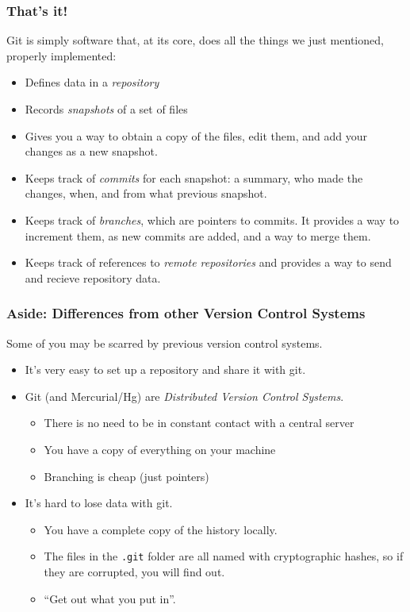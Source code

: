 \documentclass{beamer}
\begin{document}
\begin{frame}[fragile]
\frametitle{That's it!}
Git is simply software that, at its core, does all the things we just mentioned, properly implemented:
\begin{itemize}
\item Defines data in a \emph{repository}
\item Records \emph{snapshots} of a set of files
\item Gives you a way to obtain a copy of the files, edit them, and add your changes as a new snapshot.
\item Keeps track of \emph{commits} for each snapshot: a summary, who made the changes, when, and from what previous snapshot.
\item Keeps track of \emph{branches}, which are pointers to commits. It provides a way to increment them, as new commits are added, and a way to merge them.
\item Keeps track of references to \emph{remote repositories} and provides a way to send and recieve repository data.
\end{itemize}
\end{frame}

\begin{frame}[fragile]
\frametitle{Aside: Differences from other Version Control Systems}
Some of you may be scarred by previous version control systems.
\begin{itemize}
\item It's very easy to set up a repository and share it with git.
\item Git (and Mercurial/Hg) are \emph{Distributed Version Control Systems}. 
\begin{itemize}
\item There is no need to be in constant contact with a central server
\item You have a copy of everything on your machine
\item Branching is cheap (just pointers)
\end{itemize}
\item It's hard to lose data with git. 
\begin{itemize}
\item
You have a complete copy of the history locally. 
\item The files in the \texttt{.git} folder are all named with cryptographic hashes, so if they are corrupted, you will find out.
\item ``Get out what you put in''.
\end{itemize}
\end{itemize}
\end{frame}
\end{document}
